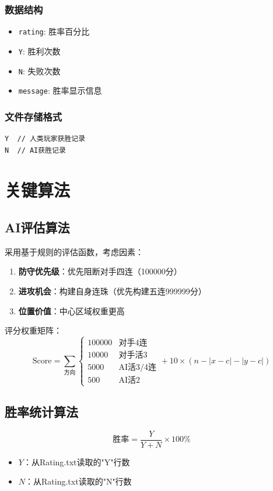 \documentclass[UTF8]{ctexart}
\begin{document}
\subsubsection{数据结构}
\begin{itemize}
    \item \texttt{rating}: 胜率百分比
    \item \texttt{Y}: 胜利次数
    \item \texttt{N}: 失败次数
    \item \texttt{message}: 胜率显示信息
\end{itemize}

\subsubsection{文件存储格式}
\begin{lstlisting}
Y  // 人类玩家获胜记录
N  // AI获胜记录
\end{lstlisting}

\section{关键算法}
\subsection{AI评估算法}
采用基于规则的评估函数，考虑因素：
\begin{enumerate}
    \item \textbf{防守优先级}：优先阻断对手四连（100000分）
    \item \textbf{进攻机会}：构建自身连珠（优先构建五连999999分）
    \item \textbf{位置价值}：中心区域权重更高
\end{enumerate}

评分权重矩阵：
\[
\text{Score} = \sum_{\text{方向}} \begin{cases} 
100000 & \text{对手4连} \\
10000 & \text{对手活3} \\
5000 & \text{AI活3/4连} \\
500 & \text{AI活2}
\end{cases} + 10 \times (n - |x - c| - |y - c|)
\]

\subsection{胜率统计算法}
\[
\text{胜率} = \frac{Y}{Y + N} \times 100\%
\]
\begin{itemize}
    \item $Y$：从Rating.txt读取的"Y"行数
    \item $N$：从Rating.txt读取的"N"行数
\end{itemize}
\end{document}
